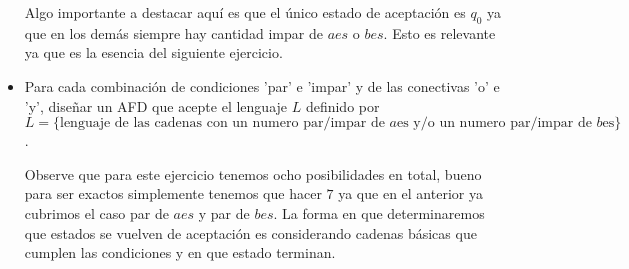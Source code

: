 \begin{itemize}[label={$\bullet$}]
\begin{basedtikz}
\centering
    \end{basedtikz}

    Algo importante a destacar aquí es que el único estado de aceptación es $q_0$ ya que en los demás siempre hay cantidad impar de $aes$ o $bes$. Esto es relevante ya que es la esencia del siguiente ejercicio.

    \item Para cada combinación de condiciones 'par' e 'impar' y de las conectivas 'o' e 'y', diseñar un AFD que acepte el lenguaje $L$ definido por\\
    $L=\{\text{lenguaje de las cadenas con un numero par/impar de }a\text{es}\text{ y/o un numero par/impar de }b\text{es}\}$.

     Observe que para este ejercicio tenemos ocho posibilidades en total, bueno para ser exactos simplemente tenemos que hacer $7$ ya que en el anterior ya cubrimos el caso par de $aes$ y par de $bes$. La forma en que determinaremos que estados se vuelven de aceptación es considerando cadenas básicas que cumplen las condiciones y en que estado terminan.\\


\end{itemize}
